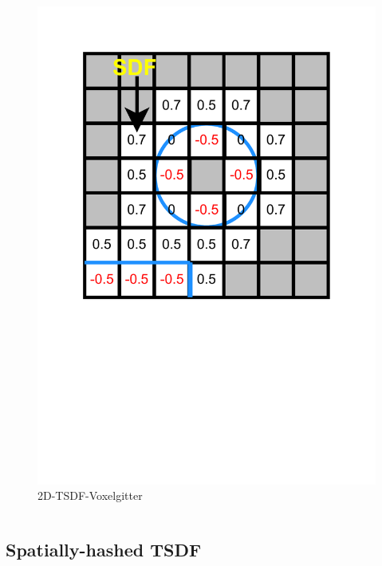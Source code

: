 \begin{frame}[t]
\begin{columns}[t]
    \begin{figure}[t]
      \vspace{-1cm}
      \includegraphics[trim=0 300 0 0, clip, width= \textwidth]{diagrams/tsdf.pdf}
      \caption{2D-TSDF-Voxelgitter} 

    \end{figure}
  
    \end{columns}
    \end{frame}

    \subsection*{Spatially-hashed TSDF}
    
